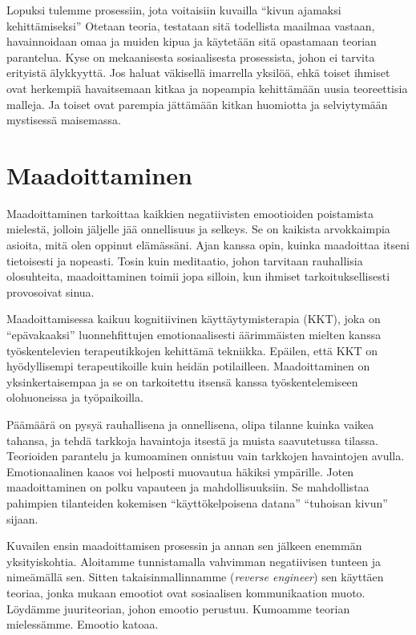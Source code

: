 Lopuksi tulemme prosessiin, jota voitaisiin kuvailla ``kivun ajamaksi kehittämiseksi'' Otetaan teoria, testataan sitä todellista maailmaa vastaan, havainnoidaan omaa ja muiden kipua ja käytetään sitä opastamaan teorian parantelua. Kyse on mekaanisesta sosiaalisesta prosessista, johon ei tarvita erityistä älykkyyttä. Jos haluat väkisellä imarrella yksilöä, ehkä toiset ihmiset ovat herkempiä havaitsemaan kitkaa ja nopeampia kehittämään uusia teoreettisia malleja. Ja toiset ovat parempia jättämään kitkan huomiotta ja selviytymään mystisessä maisemassa.

\section{Maadoittaminen}

Maadoittaminen tarkoittaa kaikkien negatiivisten emootioiden poistamista mielestä, jolloin jäljelle jää onnellisuus ja selkeys. Se on kaikista arvokkaimpia asioita, mitä olen oppinut elämässäni. Ajan kanssa opin, kuinka maadoittaa itseni tietoisesti ja nopeasti. Tosin kuin meditaatio, johon tarvitaan rauhallisia olosuhteita, maadoittaminen toimii jopa silloin, kun ihmiset tarkoituksellisesti provosoivat sinua.

Maadoittamisessa kaikuu kognitiivinen käyttäytymisterapia (KKT), joka on ``epävakaaksi'' luonnehfittujen emotionaalisesti äärimmäisten mielten kanssa työskentelevien terapeutikkojen kehittämä tekniikka. Epäilen, että KKT on hyödyllisempi terapeutikoille kuin heidän potilailleen. Maadoittaminen on yksinkertaisempaa ja se on tarkoitettu itsensä kanssa työskentelemiseen olohuoneissa ja työpaikoilla.

Päämäärä on pysyä rauhallisena ja onnellisena, olipa tilanne kuinka vaikea tahansa, ja tehdä tarkkoja havaintoja itsestä ja muista saavutetussa tilassa. Teorioiden parantelu ja kumoaminen onnistuu vain tarkkojen havaintojen avulla. Emotionaalinen kaaos voi helposti muovautua häkiksi ympärille. Joten maadoittaminen on polku vapauteen ja mahdollisuuksiin. Se mahdollistaa pahimpien tilanteiden kokemisen ``käyttökelpoisena datana'' ``tuhoisan kivun'' sijaan.

Kuvailen ensin maadoittamisen prosessin ja annan sen jälkeen enemmän yksityiskohtia. Aloitamme tunnistamalla vahvimman negatiivisen tunteen ja nimeämällä sen. Sitten takaisinmallinnamme (\emph{reverse engineer}) sen käyttäen teoriaa, jonka mukaan emootiot ovat sosiaalisen kommunikaation muoto. Löydämme juuriteorian, johon emootio perustuu. Kumoamme teorian mielessämme. Emootio katoaa.

